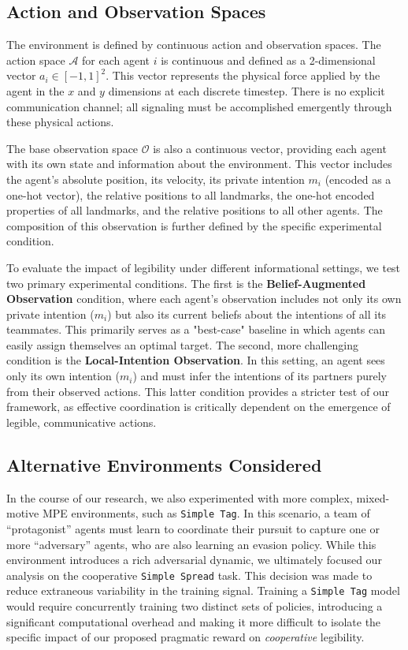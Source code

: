 \documentclass[12pt, a4paper]{report}
\begin{document}
\subsection{Action and Observation Spaces}
The environment is defined by continuous action and observation spaces. The action space $\mathcal{A}$ for each agent $i$ is continuous and defined as a 2-dimensional vector $a_i \in [-1, 1]^2$. This vector represents the physical force applied by the agent in the $x$ and $y$ dimensions at each discrete timestep. There is no explicit communication channel; all signaling must be accomplished emergently through these physical actions.

The base observation space $\mathcal{O}$ is also a continuous vector, providing each agent with its own state and information about the environment. This vector includes the agent's absolute position, its velocity, its private intention $m_i$ (encoded as a one-hot vector), the relative positions to all landmarks, the one-hot encoded properties of all landmarks, and the relative positions to all other agents. The composition of this observation is further defined by the specific experimental condition.

To evaluate the impact of legibility under different informational settings, we test two primary experimental conditions. The first is the \textbf{Belief-Augmented Observation} condition, where each agent's observation includes not only its own private intention ($m_i$) but also its current beliefs about the intentions of all its teammates. This primarily serves as a "best-case" baseline in which agents can easily assign themselves an optimal target. The second, more challenging condition is the \textbf{Local-Intention Observation}. In this setting, an agent sees only its own intention ($m_i$) and must infer the intentions of its partners purely from their observed actions. This latter condition provides a stricter test of our framework, as effective coordination is critically dependent on the emergence of legible, communicative actions.

\subsection{Alternative Environments Considered}
In the course of our research, we also experimented with more complex, mixed-motive MPE environments, such as \texttt{Simple Tag}. In this scenario, a team of ``protagonist'' agents must learn to coordinate their pursuit to capture one or more ``adversary'' agents, who are also learning an evasion policy. While this environment introduces a rich adversarial dynamic, we ultimately focused our analysis on the cooperative \texttt{Simple Spread} task. This decision was made to reduce extraneous variability in the training signal. Training a \texttt{Simple Tag} model would require concurrently training two distinct sets of policies, introducing a significant computational overhead and making it more difficult to isolate the specific impact of our proposed pragmatic reward on \textit{cooperative} legibility.
\end{document}
